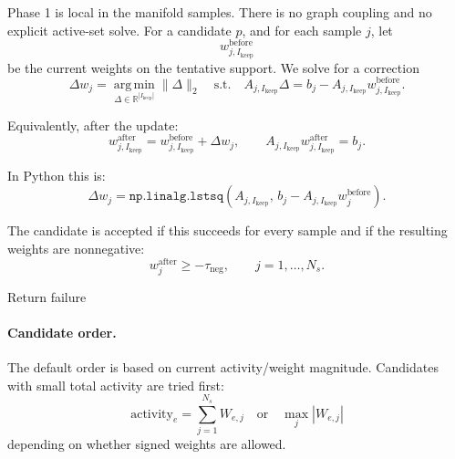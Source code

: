\documentclass[11pt]{article}
\newcommand{\R}{\mathbb{R}}
\newcommand{\argmin}{\operatorname*{arg\,min}}
\begin{document}
Phase 1 is local in the manifold samples.  There is no graph coupling and no
explicit active-set solve.  For a candidate \(p\), and for each sample \(j\), let
\[
  w_{j,I_{\mathrm{keep}}}^{\mathrm{before}}
\]
be the current weights on the tentative support.  We solve for a correction
\[
  \Delta w_j =
  \argmin_{\Delta\in\R^{|I_{\mathrm{keep}}|}}
  \|\Delta\|_2
  \quad\text{s.t.}\quad
  A_{j,I_{\mathrm{keep}}}\Delta
  =
  b_j - A_{j,I_{\mathrm{keep}}}
  w_{j,I_{\mathrm{keep}}}^{\mathrm{before}}.
\]

Equivalently, after the update:
\[
  w_{j,I_{\mathrm{keep}}}^{\mathrm{after}}
  =
  w_{j,I_{\mathrm{keep}}}^{\mathrm{before}}+\Delta w_j,
  \qquad
  A_{j,I_{\mathrm{keep}}}w_{j,I_{\mathrm{keep}}}^{\mathrm{after}}=b_j.
\]

In Python this is:
\[
  \Delta w_j =
  \texttt{np.linalg.lstsq}(A_{j,I_{\mathrm{keep}}},\,
  b_j-A_{j,I_{\mathrm{keep}}}w_j^{\mathrm{before}}).
\]

The candidate is accepted if this succeeds for every sample and if the resulting
weights are nonnegative:
\[
  w_{j}^{\mathrm{after}}\ge -\tau_{\mathrm{neg}},
  \qquad j=1,\ldots,N_s.
\]

\begin{algorithm}[H]
\caption{Phase 1 candidate elimination: no regularization}
\DontPrintSemicolon
{}
Return failure\;
\end{algorithm}

\paragraph{Candidate order.}
The default order is based on current activity/weight magnitude.  Candidates with
small total activity are tried first:
\[
  \mathrm{activity}_e =
  \sum_{j=1}^{N_s} W_{e,j}
  \quad\text{or}\quad
  \max_j |W_{e,j}|
\]
depending on whether signed weights are allowed.
\end{document}
